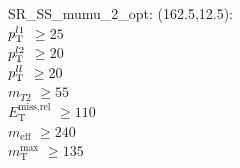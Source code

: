 SR\_SS\_mumu\_2\_opt: (162.5,12.5): \\
$p_{\text{T}}^{l1}$ $\geq 25$ \\
$p_{\text{T}}^{l2}$ $\geq 20$ \\
$p_{\text{T}}^{ll}$ $\geq 20$ \\
$m_{T2}$ $\geq 55$ \\
$E_{\text{T}}^{\text{miss,rel}}$ $\geq 110$ \\
$m_{\text{eff}}$ $\geq 240$ \\
$m_{\text{T}}^{\text{max}}$ $\geq 135$ \\

